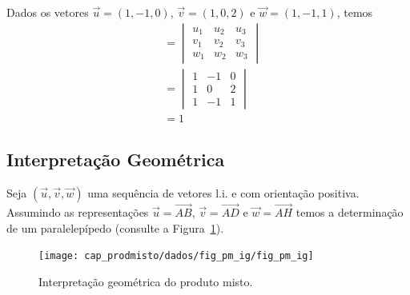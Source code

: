 \begin{ex}
  Dados os vetores $\vec{u} = (1,-1,0)$, $\vec{v} = (1,0,2)$ e $\vec{w} = (1,-1,1)$, temos
  \begin{align}
    [\vec{u},\vec{v},\vec{w}] &=
                                \begin{vmatrix}
                                  u_1 & u_2 & u_3 \\
                                  v_1 & v_2 & v_3 \\
                                  w_1 & w_2 & w_3       
                                \end{vmatrix} \\
                              &= \begin{vmatrix}
                                1 & -1 & 0 \\
                                1 & 0  & 2 \\
                                1 & -1 & 1       
                              \end{vmatrix} \\
                              &= 1
  \end{align}
\end{ex}

\subsection{Interpretação Geométrica}\label{subsec:pm_ig}

Seja $(\vec{u},\vec{v},\vec{w})$ uma sequência de vetores l.i. e com orientação positiva. Assumindo as representações $\vec{u}=\overrightarrow{AB}$, $\vec{v}=\overrightarrow{AD}$ e $\vec{w}=\overrightarrow{AH}$ temos a determinação de um paralelepípedo (consulte a Figura~\ref{fig:pm_ig}).

\begin{figure}[h]
  \centering
  \texttt{[image: cap\_prodmisto/dados/fig\_pm\_ig/fig\_pm\_ig]}
  \caption{Interpretação geométrica do produto misto.}
  \label{fig:pm_ig}
\end{figure}

